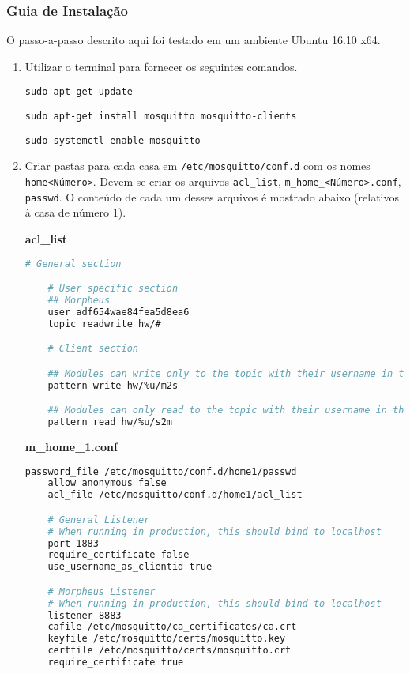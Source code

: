 \subsubsection{Guia de Instalação}\label{sec:arquivosCriados}
O passo-a-passo descrito aqui foi testado em um ambiente Ubuntu 16.10 x64.

\begin{enumerate}
\item Utilizar o terminal para fornecer os seguintes comandos.

\lstinline{sudo apt-get update}

\lstinline{sudo apt-get install mosquitto mosquitto-clients}

\lstinline{sudo systemctl enable mosquitto}

\item Criar pastas para cada casa em \lstinline{/etc/mosquitto/conf.d} com os nomes \texttt{home\textless Número\textgreater}. Devem-se criar os arquivos \texttt{acl\_list}, \texttt{m\_home\_\textless Número\textgreater .conf}, \texttt{passwd}. O conteúdo de cada um desses arquivos é mostrado abaixo (relativos à casa de número 1).


\textbf{acl\_list}

\begin{lstlisting}[language=bash]
    # General section

    # User specific section
    ## Morpheus
    user adf654wae84fea5d8ea6
    topic readwrite hw/#

    # Client section

    ## Modules can write only to the topic with their username in the m2s version
    pattern write hw/%u/m2s

    ## Modules can only read to the topic with their username in the s2m version
    pattern read hw/%u/s2m
\end{lstlisting}

\textbf{m\_home\_1.conf}

\begin{lstlisting}[language=bash]
    password_file /etc/mosquitto/conf.d/home1/passwd
    allow_anonymous false
    acl_file /etc/mosquitto/conf.d/home1/acl_list

    # General Listener
    # When running in production, this should bind to localhost
    port 1883
    require_certificate false
    use_username_as_clientid true

    # Morpheus Listener
    # When running in production, this should bind to localhost
    listener 8883
    cafile /etc/mosquitto/ca_certificates/ca.crt
    keyfile /etc/mosquitto/certs/mosquitto.key
    certfile /etc/mosquitto/certs/mosquitto.crt
    require_certificate true
\end{lstlisting}


\end{enumerate}
